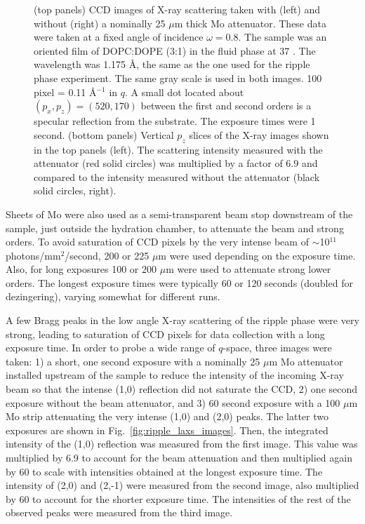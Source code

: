 \begin{figure}[jtbp]
  \caption{(top panels) CCD images of X-ray scattering taken with (left) and without 
  (right) a nominally 25 $\mu$m thick Mo attenuator. These data were taken 
  at a fixed angle of incidence $\omega=0.8$\textdegree. The sample was an oriented film of 
  DOPC:DOPE (3:1) in the fluid phase at 37 \textcelsius. The wavelength
  was 1.175 \AA, the same as the one used for the ripple phase experiment.
  The same gray scale is used in both images. 100 pixel =  0.11 \AA$^{-1}$ in $q$. 
  A small dot located about $(p_x,p_z)=(520,170)$ between the first and second orders is 
  a specular reflection from the substrate. The exposure times were 1 second. 
  (bottom panels) Vertical $p_z$ slices of the X-ray images shown in the top panels (left).
  The scattering intensity measured with the attenuator (red solid circles) 
  was multiplied by a factor of 6.9 and compared to the intensity measured 
  without the attenuator (black solid circles, right).}
  \label{fig:olddopc}
\end{figure}

Sheets of Mo were also used as a semi-transparent beam stop downstream of the 
sample, just 
outside the hydration chamber, to attenuate the beam and strong orders.  
To avoid saturation of CCD pixels by
the very intense beam of $\sim$10$^{11}$ photons/mm$^2$/second, 200 or 225 $\mu$m 
were used depending on the exposure time.  Also, for long exposures 100 or 200 
$\mu$m were used to attenuate strong lower orders.  The longest exposure times 
were typically 60 or 120 seconds (doubled for dezingering), varying somewhat for 
different runs.

A few Bragg peaks in the low angle X-ray scattering of the ripple phase
were very strong, leading to saturation of CCD pixels for data collection
with a long exposure time. 
In order to probe a wide range of $q$-space, three images were taken:
1) a short, one second exposure with a nominally 25 $\mu$m
Mo attenuator installed upstream of the sample to reduce the 
intensity
of the incoming X-ray beam so that the intense (1,0) reflection did not 
saturate the CCD, 2) one second exposure without the beam attenuator,
and 3) 60 second exposure with a 100 $\mu$m Mo strip attenuating the very 
intense 
(1,0) and (2,0) peaks. The latter two exposures are shown in 
Fig.~\ref{fig:ripple_laxs_images}. 
Then, the integrated intensity of the (1,0) reflection was measured
from the first image. This value was multiplied by 6.9 to account for the beam
attenuation and then multiplied again by 60 to scale with intensities obtained 
at the longest exposure time. 
The intensity of (2,0) and (2,-1) were measured from the second image, also
multiplied by 60 to account for the shorter exposure time. The intensities of
the rest of the observed peaks were measured from the third image.

